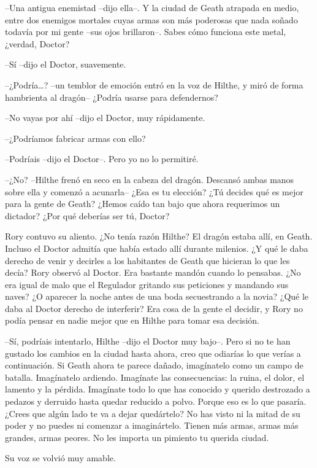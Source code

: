 {--Una antigua enemistad --dijo ella--. Y la ciudad de Geath atrapada
	en medio, entre dos enemigos mortales cuyas armas son más poderosas que
	nada soñado todavía por mi gente --sus ojos brillaron--. Sabes cómo
funciona este metal, ¿verdad, Doctor?}

{--Sí --dijo el Doctor, suavemente.}

{--¿Podría\ldots{}? --un temblor de emoción entró en la voz de Hilthe,
y miró de forma hambrienta al dragón-- ¿Podría usarse para defendernos?}

{--No vayas por ahí --dijo el Doctor, muy rápidamente.}

{--¿Podríamos fabricar armas con ello?}

{--Podríais --dijo el Doctor--. Pero yo no lo permitiré.}

{--¿No? --Hilthe frenó en seco en la cabeza del dragón. Descansó ambas
	manos sobre ella y comenzó a acunarla-- ¿Esa es tu elección? ¿Tú decides
	qué es mejor para la gente de Geath? ¿Hemos caído tan bajo que ahora
requerimos un dictador? ¿Por qué deberías ser tú, Doctor?}

{Rory contuvo su aliento. ¿No tenía razón Hilthe? El dragón estaba allí,
	en Geath. Incluso el Doctor admitía que había estado allí durante
	milenios. ¿Y qué le daba derecho de venir y decirles a los habitantes de
	Geath que hicieran lo que les decía? Rory observó al Doctor. Era
	bastante mandón cuando lo pensabas. ¿No era igual de malo que el
	Regulador gritando sus peticiones y mandando sus naves? ¿O aparecer la
	noche antes de una boda secuestrando a la novia? ¿Qué le daba al Doctor
	derecho de interferir? Era cosa de la gente el decidir, y Rory no podía
pensar en nadie mejor que en Hilthe para tomar esa decisión.}

{--Sí, podríais intentarlo, Hilthe --dijo el Doctor muy bajo--. Pero
	si no te han gustado los cambios en la ciudad hasta ahora, creo que
	odiarías lo que verías a continuación. Si Geath ahora te parece dañado,
	imagínatelo como un campo de batalla. Imagínatelo ardiendo. Imagínate
	las consecuencias: la ruina, el dolor, el lamento y la pérdida.
	Imagínate todo lo que has conocido y querido destrozado a pedazos y
	derruido hasta quedar reducido a polvo. Porque eso es lo que pasaría.
	¿Crees que algún lado te va a dejar quedártelo? No has visto ni la mitad
	de su poder y no puedes ni comenzar a imaginártelo. Tienen más armas,
	armas más grandes, armas peores. No les importa un pimiento tu querida
ciudad.}

{Su voz se volvió muy amable.}

